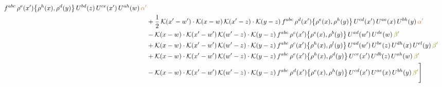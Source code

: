 \documentclass[9pt]{article}
\numberwithin{equation}{section}
\begin{document}
\begin{align}
f^{abc}\,\rho^{e}(x')\big\{\rho^{h}(x),\rho^{d}(y)\big\}\,U^{bd}(z)\,U^{ce}(x')\,U^{ah}(w)\,{\color{brown}\alpha'}\notag \\ & +\frac{1}{2}\,\mathcal{K}(x'-w')\cdot\mathcal{K}(x-w)\,\mathcal{K}(x'-z)\cdot\mathcal{K}(y-z)\, f^{abc}\,\rho^{d}(x')\big\{\rho^{e}(x),\rho^{h}(y)\big\}\,U^{cd}(x')\,U^{ae}(x)\,U^{bh}(y)\,{\color{brown}\alpha'}\notag \\ & -\mathcal{K}(x-w)\cdot\mathcal{K}(x'-w')\,\mathcal{K}(w'-z)\cdot\mathcal{K}(y-z)\, f^{abc}\,\rho^{c}(x')\big\{\rho^{e}(x),\rho^{b}(y)\big\}\,U^{ad}(w')\,U^{de}(w)\,{\color{olive}\beta'}\notag \\ & +\mathcal{K}(x-w)\cdot\mathcal{K}(x'-w')\,\mathcal{K}(w'-z)\cdot\mathcal{K}(y-z)\, f^{abc}\,\rho^{c}(x')\big\{\rho^{h}(x),\rho^{l}(y)\big\}\,U^{ad}(w')\,U^{be}(z)\,U^{dh}(x)\,U^{el}(y)\,{\color{olive}\beta'}\notag\\ &+\mathcal{K}(x-w)\cdot\mathcal{K}(x'-w')\,\mathcal{K}(w'-z)\cdot\mathcal{K}(y-z)\, f^{abc}\,\rho^{e}(x')\big\{\rho^{h}(x),\rho^{d}(y)\big\}\,U^{ce}(x')\,U^{db}(z)\,U^{ah}(w)\,{\color{olive}\beta'}\notag \\ &-\mathcal{K}(x-w)\cdot\mathcal{K}(x'-w')\,\mathcal{K}(w'-z)\cdot\mathcal{K}(y-z)\, f^{abc}\,\rho^{d}(x')\big\{\rho^{e}(x),\rho^{h}(y)\big\}\,U^{cd}(x')\,U^{ae}(x)\,U^{bh}(y)\,{\color{olive}\beta'}\Bigg]
\end{align}
\end{document}
